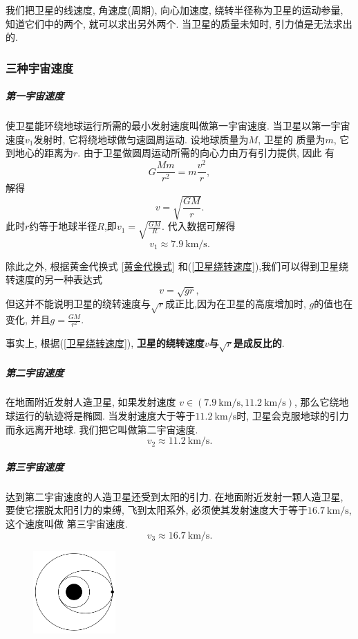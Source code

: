 \documentclass[11pt,a4paper]{ctexart}
\begin{document}
我们把卫星的线速度, 角速度(周期), 向心加速度, 绕转半径称为卫星的运动参量, 知道它们中的两个, 就可以求出另外两个.
当卫星的质量未知时, 引力值是无法求出的.

\subsubsection{三种宇宙速度}

\subparagraph{第一宇宙速度} 使卫星能环绕地球运行所需的最小发射速度叫做第一宇宙速度.
当卫星以第一宇宙速度$v_1$发射时, 它将绕地球做匀速圆周运动. 设地球质量为$M$, 卫星的
质量为$m$, 它到地心的距离为$r$. 由于卫星做圆周运动所需的向心力由万有引力提供, 因此
有$$G\frac{Mm}{r^2} = m\frac{v^2}{r},$$解得
\begin{equation}
	v = \sqrt{\frac{GM}{r}}.
	\label{卫星绕转速度}
\end{equation}
此时$r$约等于地球半径$R$,即$v_1 = \displaystyle\sqrt{\frac{GM}{R}}$.
代入数据可解得$$v_1 \approx 7.9\ \mathrm{km/s}.$$

除此之外, 根据黄金代换式 \ref{黄金代换式} 和(\ref{卫星绕转速度}),我们可以得到卫星绕转速度的另一种表达式$$v = \sqrt{gr},$$
但这并不能说明卫星的绕转速度与$\sqrt{r}$成正比,因为在卫星的高度增加时, $g$的值也在变化,
并且$g = \displaystyle\frac{GM}{r^2}$.

事实上, 根据(\ref{卫星绕转速度}), \textbf{卫星的绕转速度$v$与$\sqrt{r}$是成反比的}.

\subparagraph{第二宇宙速度} 在地面附近发射人造卫星, 如果发射速度
$v \in (7.9\ \mathrm{km/s}, 11.2\ \mathrm{km/s})$, 那么它绕地球运行的轨迹将是椭圆.
当发射速度大于等于$11.2\ \mathrm{km/s}$时, 卫星会克服地球的引力而永远离开地球.
我们把它叫做第二宇宙速度.$$v_2 \approx 11.2\ \mathrm{km/s}.$$

\subparagraph{第三宇宙速度} 达到第二宇宙速度的人造卫星还受到太阳的引力. 在地面附近发射一颗人造卫星,
要使它摆脱太阳引力的束缚, 飞到太阳系外, 必须使其发射速度大于等于$16.7\ \mathrm{km/s}$, 这个速度叫做
第三宇宙速度.$$v_3 \approx 16.7\ \mathrm{km/s}.$$
\begin{figure}
	\flushright
	\includegraphics[width=0.28\textwidth]{pic/pic13.pdf}
	\label{fic13}
\end{figure}
\end{document}
